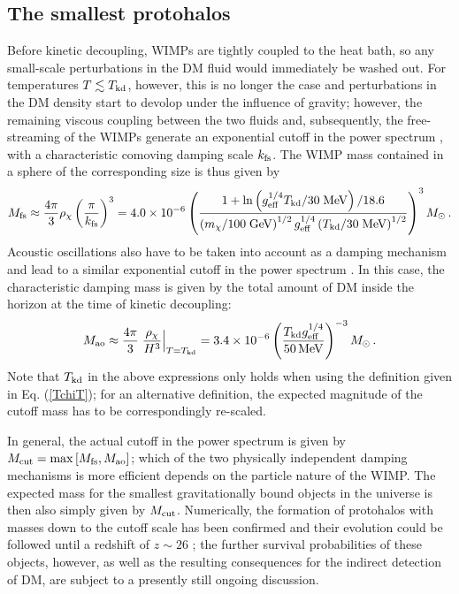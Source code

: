 \documentclass[a4paper,10pt,oneside]{book}
\begin{document}
\subsection{The smallest protohalos}


Before kinetic decoupling, WIMPs are tightly coupled to the heat bath, so
any small-scale perturbations in the DM fluid would immediately be washed out.
For temperatures $T\lesssim T_{\rm kd}$, however, this is no longer the case and perturbations
 in the DM density start to devolop under the influence of gravity; however, the 
remaining viscous coupling between the two fluids and, subsequently, the free-streaming 
of the WIMPs generate an exponential cutoff in the power spectrum \cite{Green:2005fa}, 
with a characteristic comoving damping scale $k_{\rm fs}$. The WIMP mass contained in a 
sphere of the corresponding size is thus given by \cite{Bringmann:2009vf}
\begin{equation}
   M_{\rm fs}\approx\frac{4\pi}{3}\rho_\chi\left(\frac{\pi}{k_{\rm fs}}\right)^3
=4.0\times 10^{-6}\left(\frac{1+{\rm ln}\left(g_{\rm eff}^{1/4}T_{\rm kd}/30\;{\rm MeV}\right)/18.6}{\left(m_\chi/100\; {\rm GeV}\right)^{1/2} g_{\rm eff}^{1/4}\left(T_{\rm kd}/30\;{\rm MeV}\right)^{1/2}}\right)^3M_\odot\,.
\end{equation}
Acoustic oscillations also have to be taken into account as a damping mechanism 
and lead to a similar exponential cutoff in the power spectrum
\cite{Loeb:2005pm,Bertschinger:2006nq}. In this case, the characteristic damping mass 
 is given by the total amount of DM inside the horizon at the time of kinetic decoupling:
\begin{equation}
  M_{\rm ao}\approx\frac{4\pi}{3}\left.\frac{\rho_\chi}{H^3}\right|_{T=T_{\rm{kd}}}
  =3.4\times10^{-6}\left(\frac{T_{\rm kd}g_{\rm eff}^{1/4}}{50\,{\rm MeV}}\right)^{-3}M_\odot\,.
\end{equation}
Note that $T_{\rm kd}$ in the above expressions only holds when using the definition given in Eq. (\ref{TchiT}); 
for an alternative definition, the expected magnitude of the cutoff mass has to be correspondingly re-scaled.


In general, the actual cutoff in the power spectrum is  given by
$M_{\rm cut}=\max\left[M_{\rm fs},M_{\rm ao}\right]$; which of the two
physically independent damping mechanisms is more efficient depends on the 
particle nature of the WIMP. 
The expected mass for the smallest gravitationally bound objects in the 
universe is then also simply given by $M_{\rm cut}$. Numerically, the formation of 
protohalos with masses down to the cutoff scale has been confirmed
and their evolution could be 
followed until a redshift of $z\sim26$ \cite{Diemand:2005vz}; the further survival 
probabilities of these objects, however, as well as the resulting consequences for the indirect 
detection of DM, are subject to a presently still ongoing discussion.
\end{document}
